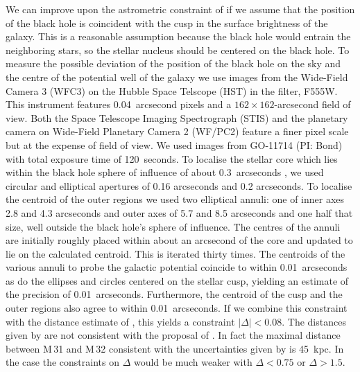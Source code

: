 \documentclass[useAMS,usenatbib]{mn2e}
\begin{document}
We can improve upon the astrometric constraint of
\citet{2015arXiv150203231Y} if we assume that the position of the
black hole is coincident with the cusp in the surface brightness of
the galaxy.  This is a reasonable assumption because the black hole
would entrain the neighboring stars, so the stellar nucleus should be
centered on the black hole. To measure the possible deviation of the
position of the black hole on the sky and the centre of the potential
well of the galaxy we use images from the Wide-Field Camera 3 (WFC3)
on the Hubble Space Telscope (HST) in the filter, F555W.  This
instrument features 0.04~arcsecond pixels and a $162 \times
162$-arcsecond field of view.  Both the Space Telescope Imaging
Spectrograph (STIS) and the planetary camera on Wide-Field Planetary
Camera 2 (WF/PC2) feature a finer pixel scale but at the expense of
field of view.  We used images from GO-11714 (PI: Bond) with total
exposure time of 120~seconds.  To localise the stellar core which lies
within the black hole sphere of influence of about 0.3~arcseconds
\citep{2001ApJ...550..668J}, we used circular and elliptical apertures
of 0.16 arcseconds and 0.2 arcseconds.  To localise the centroid of
the outer regions we used two elliptical annuli: one of inner axes 2.8
and 4.3 arcseconds and outer axes of 5.7 and 8.5 arcseconds and one
half that size, well outside the black hole's sphere of influence.
The centres of the annuli are initially roughly placed within about an
arcsecond of the core and updated to lie on the calculated
centroid. This is iterated thirty times.  The centroids of the various
annuli to probe the galactic potential coincide to within
0.01~arcseconds as do the ellipses and circles centered on the stellar
cusp, yielding an estimate of the precision of 0.01~arcseconds.
Furthermore, the centroid of the cusp and the outer regions also agree
to within 0.01~arcseconds.  If we combine this constraint with the
distance estimate of \citet{2006AJ....131.1405K}, this yields a
constraint $|\Delta|<0.08$.  The distances given by
\citet{2006AJ....131.1405K} are not consistent with the proposal of
\citet{2014ApJ...788L..38D}.  In fact the maximal distance between
M\,31 and M\,32 consistent with the uncertainties given by
\cite{2006AJ....131.1405K} is 45~kpc.  In the case the constraints on
$\Delta$ would be much weaker with $\Delta<0.75$ or $\Delta>1.5$.
\end{document}
